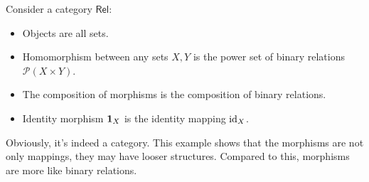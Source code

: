 \documentclass{article}
\begin{document}
\begin{exm}[$\mathsf{ZF}$]
	Consider a category $\mathsf{Rel}$:
	\begin{itemize}
		\item Objects are all sets.
		\item Homomorphism between any sets $X,Y$ is the power set of binary relations $\mathscr{P}(X\times Y)$.
		\item The composition of morphisms is the composition of binary relations.
		\item Identity morphism $\mathbf{1}_X$ is the identity mapping $\mathrm{id}_X$.
	\end{itemize}
	Obviously, it's indeed a category. This example shows that the morphisms are not only mappings, they may have looser structures. Compared to this, morphisms are more like binary relations.
\end{exm}
\end{document}
